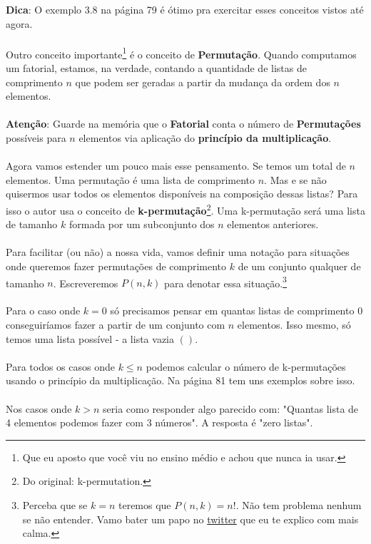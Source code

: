 \documentclass[a4paper,11pt]{book}
\theoremstyle{definition}
\theoremstyle{break}
\begin{document}
\textbf{Dica}: O exemplo 3.8 na página 79 é ótimo pra exercitar esses conceitos vistos até agora.
\\
\\
Outro conceito importante\footnote{Que eu aposto que você viu no ensino médio e achou que nunca ia usar.} é o conceito de \textbf{Permutação}. Quando computamos um fatorial, estamos, na verdade, contando a quantidade de listas de comprimento $n$ que podem ser geradas a partir da mudança da ordem dos $n$ elementos.
\\
\\
\textbf{Atenção}: Guarde na memória que o \textbf{Fatorial} conta o número de \textbf{Permutações} possíveis para $n$ elementos via aplicação do \textbf{princípio da multiplicação}.
\\
\\
Agora vamos estender um pouco mais esse pensamento. Se temos um total de $n$ elementos. Uma permutação é uma lista de comprimento $n$. Mas e se não quisermos usar todos os elementos disponíveis na composição dessas listas? Para isso o autor usa o conceito de \textbf{k-permutação}\footnote{Do original: k-permutation.}. Uma k-permutação será uma lista de tamanho $k$ formada por um subconjunto dos $n$ elementos anteriores.
\\
\\
Para facilitar (ou não) a nossa vida, vamos definir uma notação para situações onde queremos fazer permutações de comprimento $k$ de um conjunto qualquer de tamanho $n$. Escreveremos $P(n,k)$ para denotar essa situação.\footnote{Perceba que se $k = n$ teremos que $P(n,k) = n!$. Não tem problema nenhum se não entender. Vamo bater um papo no \href{https://twitter.com/bruno_ruas2}{twitter} que eu te explico com mais calma.} 
\\
\\
Para o caso onde $k = 0$ só precisamos pensar em quantas listas de comprimento $0$ conseguiríamos fazer a partir de um conjunto com $n$ elementos. Isso mesmo, só temos uma lista possível - a lista vazia $()$. 
\\
\\
Para todos os casos onde $k \leq n$ podemos calcular o número de k-permutações usando o princípio da multiplicação. Na página 81 tem uns exemplos sobre isso.
\\
\\
Nos casos onde $k > n$ seria como responder algo parecido com: "Quantas lista de 4 elementos podemos fazer com 3 números". A resposta é "zero listas".
\\
\end{document}
